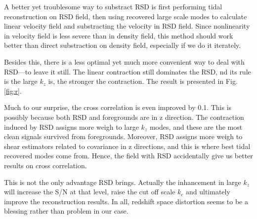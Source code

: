 A better yet troublesome way to substract RSD is 
first performing tidal reconstruction on RSD field, 
then using recovered large scale modes to calculate linear velocity field 
and substracting the velocity in RSD field.  
Since nonlinearity in velocity field is less severe than in density field, 
this method should work better than direct substraction on density field, 
especially if we do it iterately.

Besides this, there is a less optimal yet much more convenient way to deal 
with RSD---to leave it still. 
The linear contraction still dominates the RSD, 
nd its rule is the large $k_z$ is, the stronger the contraction. 
The result is presented in Fig.\ref{fig:r}. 

Much to our surprise, the cross correlation is even improved by 0.1. 
This is possibly because both RSD and foregrounds are in z direction. 
The contraction induced by RSD assigns more weigh to large $k_z$ modes, 
and these are the most clean signals survived from foregrounds.  
Moreover, RSD assigns more weigh to shear estimators related to covariance in z directions, 
and this is where best tidal recovered modes come from.  
Hence, the field with RSD accidentally give us better results on cross correlation.

This is not the only advantage RSD brings. 
Actually the inhancement in large $k_z$ will increase the S/N at that level, 
raise the cut off scale $k_c$ and ultimately improve the reconstruction results. 
In all, redshift space distortion seems to be a blessing rather than problem in our case. 

